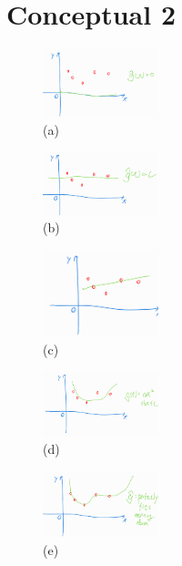 \documentclass{article}
\begin{document}
\section*{Conceptual 2}
\begin{figure}[h]
    \centering
    \includegraphics[width=0.3\textwidth]{figs/2a.png}
    \caption{(a)}
    \label{fig:2a}
\end{figure}
\begin{figure}[h]
    \centering
    \includegraphics[width=0.3\textwidth]{figs/2b.png}
    \caption{(b)}
    \label{fig:2b}
\end{figure}
\begin{figure}[h]
    \centering
    \includegraphics[width=0.3\textwidth]{figs/2c.png}
    \caption{(c)}
    \label{fig:2c}
\end{figure}
\begin{figure}[h]
    \centering
    \includegraphics[width=0.3\textwidth]{figs/2d.png}
    \caption{(d)}
    \label{fig:2d}
\end{figure}
\begin{figure}[h]
    \centering
    \includegraphics[width=0.3\textwidth]{figs/2e.png}
    \caption{(e)}
    \label{fig:2e}
\end{figure}
\newpage
\end{document}
